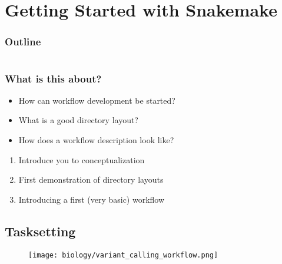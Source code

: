 \section{Getting Started with Snakemake}

\begin{frame}
    \frametitle{Outline}
    \begin{columns}[t]
        \begin{column}{.5\textwidth}
            \tableofcontents[sections={1-9},currentsection]
        \end{column}
        \begin{column}{.5\textwidth}
            \tableofcontents[sections={10-18},currentsection]
        \end{column}
    \end{columns}
\end{frame}

\begin{frame}
	\frametitle{What is this about?}
	\begin{question}[Questions]
		\begin{itemize}
			\item How can workflow development be started?
			\item What is a good directory layout?
			\item How does a workflow description look like?
		\end{itemize}
	\end{question}
	\begin{docs}[Objectives]
		\begin{enumerate}
			\item Introduce you to conceptualization
			\item First demonstration of directory layouts
			\item Introducing a first (very basic) workflow
		\end{enumerate}
	\end{docs}
\end{frame}

\subsection{Tasksetting}

\begin{frame}
  \begin{figure}
    \centering
    \texttt{[image: biology/variant\_calling\_workflow.png]}
  \end{figure}
\end{frame}


